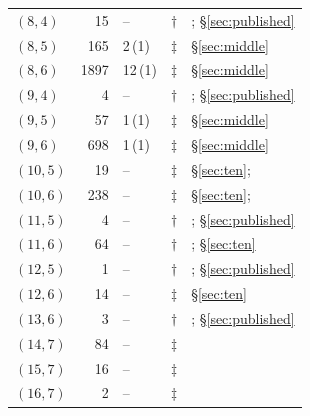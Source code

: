 \begin{longtable}{@{}lrllp{}@{}}
$(8,4)$ & 15 & -- & $\dagger$ & \cite{Sh08}; \S\ref{sec:published} \\
$(8,5)$ & 165 & 2\,(1) & $\ddagger$ & \S\ref{sec:middle} \\
$(8,6)$ & 1897 & 12\,(1) & $\ddagger$ & \S\ref{sec:middle} \\
$(9,4)$ & 4 & -- & $\dagger$ & \cite{EF}; \S\ref{sec:published} \\
$(9,5)$ & 57 & 1\,(1) & $\ddagger$ & \S\ref{sec:middle} \\
$(9,6)$ & 698 & 1\,(1) & $\ddagger$ & \S\ref{sec:middle} \\
$(10,5)$ & 19 & -- & $\ddagger$ & \S\ref{sec:ten}; \cite[Cor.~7]{AC} \\
$(10,6)$ & 238 & -- & $\ddagger$ & \S\ref{sec:ten}; \cite[Cor.~7]{AC} \\
$(11,5)$ & 4 & -- & $\dagger$ & \cite{W11}; \S\ref{sec:published} \\
$(11,6)$ & 64 & -- & $\dagger$ & \cite{AA}; \S\ref{sec:ten} \\
$(12,5)$ & 1 & -- & $\dagger$ & \cite{EF,Sh08}; \S\ref{sec:published} \\
$(12,6)$ & 14 & -- & $\ddagger$ & \S\ref{sec:ten} \\
$(13,6)$ & 3 & -- & $\dagger$ & \cite{W12,SO}; \S\ref{sec:published} \\
$(14,7)$ & 84 & -- & $\ddagger$ & \cite{AC14} \\
$(15,7)$ & 16 & -- & $\ddagger$ & \cite[Thm.~16]{AC} \\
$(16,7)$ & 2 & -- & $\ddagger$ & \cite[Thm.~1]{AC} \\
\bottomrule
\end{longtable}
